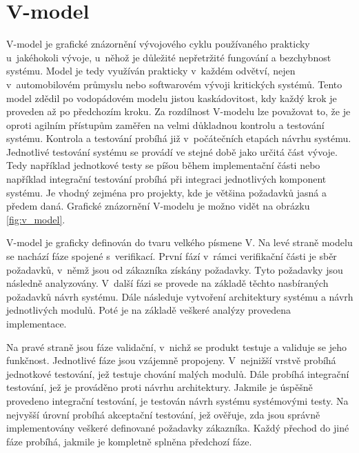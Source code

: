 \documentclass[czech,master]{diploma}
\begin{document}
\section{V-model}
V-model je grafické znázornění vývojového cyklu používaného prakticky u~jakéhokoli vývoje, u~něhož je důležité nepřetržité fungování a bezchybnost systému. Model je tedy využíván prakticky v~každém odvětví, nejen v~automobilovém průmyslu nebo softwarovém vývoji kritických systémů. Tento model zdědil po vodopádovém modelu jistou kaskádovitost, kdy každý krok je proveden až po předchozím kroku. Za rozdílnost V-modelu lze považovat to, že je oproti agilním přístupům zaměřen na velmi důkladnou kontrolu a testování systému. Kontrola a testování probíhá již v~počátečních etapách návrhu systému. Jednotlivé testování systému se provádí ve stejné době jako určitá část vývoje. Tedy například jednotkové testy se píšou během implementační části nebo například integrační testování probíhá při integraci jednotlivých komponent systému. Je vhodný zejména pro projekty, kde je většina požadavků jasná a předem daná. Grafické znázornění V-modelu je možno vidět na obrázku \ref{fig:v_model}.

V-model je graficky definován do tvaru velkého písmene V. Na levé straně modelu se nachází fáze spojené s~verifikací. První fází v~rámci verifikační části je sběr požadavků, v~němž jsou od zákazníka získány požadavky. Tyto požadavky jsou následně analyzovány. V~další fázi se provede na základě těchto nasbíraných požadavků návrh systému. Dále následuje vytvoření architektury systému a návrh jednotlivých modulů. Poté je na základě veškeré analýzy provedena implementace.

Na pravé straně jsou fáze validační, v~nichž se produkt testuje a validuje se jeho funkčnost. Jednotlivé fáze jsou vzájemně propojeny. V~nejnižší vrstvě probíhá jednotkové testování, jež testuje chování malých modulů. Dále probíhá integrační testování, jež je prováděno proti návrhu architektury. Jakmile je úspěšně provedeno integrační testování, je testován návrh systému systémovými testy. Na nejvyšší úrovní probíhá akceptační testování, jež ověřuje, zda jsou správně implementovány veškeré definované požadavky zákazníka. Každý přechod do jiné fáze probíhá, jakmile je kompletně splněna předchozí fáze.
\end{document}
